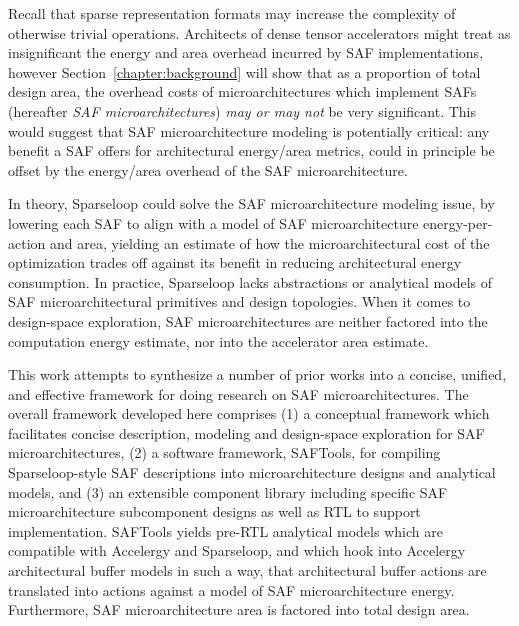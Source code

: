 Recall that sparse representation formats may increase the complexity of otherwise trivial operations. Architects of dense tensor accelerators might treat as insignificant the energy and area overhead incurred by SAF implementations, however Section~\ref{chapter:background} will show that as a proportion of total design area, the overhead costs of microarchitectures which implement SAFs (hereafter \textit{SAF microarchitectures}) \textit{may or may not} be very significant. This would suggest that SAF microarchitecture modeling is potentially critical: any benefit a SAF offers for architectural energy/area metrics, could in principle be offset by the energy/area overhead of the SAF microarchitecture.

In theory, Sparseloop could solve the SAF microarchitecture modeling issue, by lowering each SAF to align with a model of SAF microarchitecture energy-per-action and area, yielding an estimate of how the microarchitectural cost of the optimization trades off against its benefit in reducing architectural energy consumption. In practice, Sparseloop lacks abstractions or analytical models of SAF microarchitectural primitives and design topologies. When it comes to design-space exploration, SAF microarchitectures are neither factored into the computation energy estimate, nor into the accelerator area estimate.

This work attempts to synthesize a number of prior works into a concise, unified, and effective framework for doing research on SAF microarchitectures. The overall framework developed here comprises (1) a conceptual framework which facilitates concise description, modeling and design-space exploration for SAF microarchitectures, (2) a software framework, SAFTools, for compiling Sparseloop-style SAF descriptions into microarchitecture designs and analytical models, and (3) an extensible component library including specific SAF microarchitecture subcomponent designs as well as RTL to support implementation. SAFTools yields pre-RTL analytical models which are compatible with Accelergy and Sparseloop, and which hook into Accelergy architectural buffer models in such a way, that architectural buffer actions are translated into actions against a model of SAF microarchitecture energy. Furthermore, SAF microarchitecture area is factored into total design area. 

